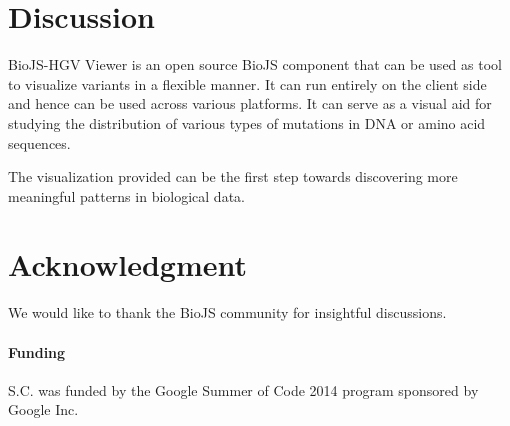 \documentclass{bioinfo}
\begin{document}



\section{Discussion}

 BioJS-HGV Viewer is an open source BioJS component that can be used as tool to visualize variants in a flexible manner. It can run entirely on the client side and hence can be used across various platforms. It can serve as a visual aid for studying the distribution of various types of mutations in DNA
 or amino acid sequences.
 
 The visualization provided can be the first step towards discovering more meaningful patterns in biological data. 






%
%









\section*{Acknowledgment}
We would like to thank the BioJS community for insightful discussions.


\paragraph{Funding\textcolon} S.C. was funded by the Google Summer of Code 2014 program sponsored by Google Inc.


%
%
%
%
%
%
%

\end{document}
